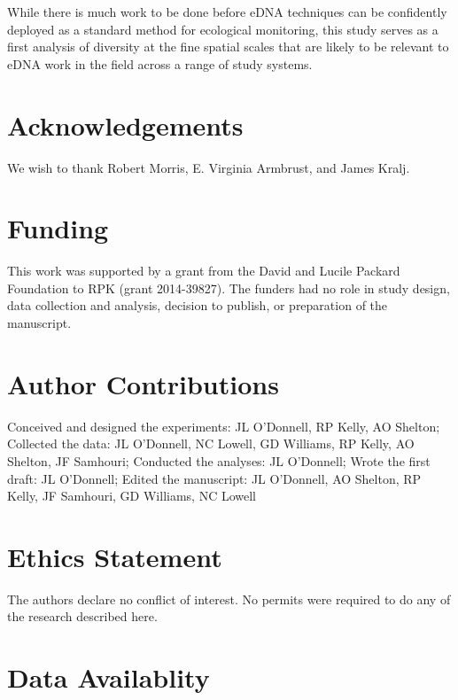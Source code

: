 \documentclass[11pt,letterpaper]{article} %
\begin{document}
While there is much work to be done before eDNA techniques can be confidently deployed as a standard method for ecological monitoring, this study serves as a first analysis of diversity at the fine spatial scales that are likely to be relevant to eDNA work in the field across a range of study systems.

\section*{Acknowledgements}
We wish to thank Robert Morris, E. Virginia Armbrust, and James Kralj.

\section*{Funding}
This work was supported by a grant from the David and Lucile Packard Foundation to RPK (grant 2014-39827). The funders had no role in study design, data collection and analysis, decision to publish, or preparation of the manuscript.

\section*{Author Contributions}
Conceived and designed the experiments:
JL O'Donnell, RP Kelly, AO Shelton;
Collected the data:
JL O'Donnell, NC Lowell, GD Williams, RP Kelly, AO Shelton, JF Samhouri;
Conducted the analyses:
JL O'Donnell;
Wrote the first draft:
JL O'Donnell;
Edited the manuscript:
JL O'Donnell, AO Shelton, RP Kelly, JF Samhouri, GD Williams, NC Lowell


\section*{Ethics Statement}
The authors declare no conflict of interest. No permits were required to do any of the research described here.

\section*{Data Availablity}
\label{data}
\end{document}
